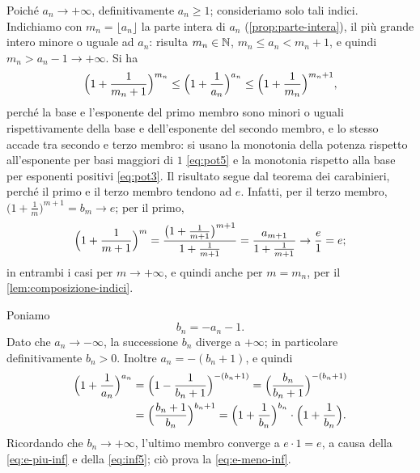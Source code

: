 \begin{dimostrazione}
Poiché $a_{n}\to+\infty$, definitivamente $a_{n}\ge1$; consideriamo solo tali indici.
Indichiamo con $m_{n}=\lfloor a_{n}\rfloor$ la parte intera di $a_{n}$
(\cref{prop:parte-intera}), il più grande intero minore o uguale ad $a_{n}$: risulta
$m_{n}\in\mathbb{N}$, $m_{n}\le a_{n}<m_{n}+1$, e quindi $m_{n}>a_{n}-1\to+\infty$. Si ha
\begin{equation}\label{eq:e-carabinieri}
  \Bigl(1+\frac1{m_{n}+1}\Bigr)^{m_{n}}\le\Bigl(1+\frac1{a_{n}}\Bigr)^{a_{n}}\le\Bigl(1+\frac1{m_{n}}\Bigr)^{m_{n}+1},
\end{equation}
perché la base e l'esponente del primo membro sono minori o uguali rispettivamente della
base e dell'esponente del secondo membro, e lo stesso accade tra secondo e terzo membro:
si usano la monotonia della potenza rispetto all'esponente per basi maggiori di $1$
\eqref{eq:pot5} e la monotonia rispetto alla base per esponenti positivi \eqref{eq:pot3}.
Il risultato segue dal teorema dei carabinieri, perché il primo e il terzo membro tendono
ad $e$. Infatti, per il terzo membro, $\bigl(1+\frac1{m}\bigr)^{m+1}=b_{m}\to e$; per il
primo,
\begin{equation}\label{eq:e-primo-membro}
  \Bigl(1+\frac1{m+1}\Bigr)^{m}=\frac{\bigl(1+\frac1{m+1}\bigr)^{m+1}}{1+\frac1{m+1}}
  =\frac{a_{m+1}}{1+\frac1{m+1}}\to\frac e1=e ;
\end{equation}
in entrambi i casi per $m\to+\infty$, e quindi anche per $m=m_{n}$, per il
\cref{lem:composizione-indici}.
\end{dimostrazione}

\begin{dimostrazione}
Poniamo
\begin{equation}\label{eq:e-cambio}
  b_{n}=-a_{n}-1 .
\end{equation}
Dato che $a_{n}\to-\infty$, la successione $b_{n}$ diverge a $+\infty$; in particolare
definitivamente $b_{n}>0$. Inoltre $a_{n}=-(b_{n}+1)$, e quindi
\begin{equation}\label{eq:e-meno-inf-passo}
\begin{split}
  \Bigl(1+\frac1{a_{n}}\Bigr)^{a_{n}}&=\Bigl(1-\frac1{b_{n}+1}\Bigr)^{-(b_{n}+1)}
  =\Bigl(\frac{b_{n}}{b_{n}+1}\Bigr)^{-(b_{n}+1)}\\
  &=\Bigl(\frac{b_{n}+1}{b_{n}}\Bigr)^{b_{n}+1}
  =\Bigl(1+\frac1{b_{n}}\Bigr)^{b_{n}}\cdot\Bigl(1+\frac1{b_{n}}\Bigr).
\end{split}
\end{equation}
Ricordando che $b_{n}\to+\infty$, l'ultimo membro converge a $e\cdot1=e$, a causa della
\eqref{eq:e-piu-inf} e della \eqref{eq:inf5}; ciò prova la \eqref{eq:e-meno-inf}.
\end{dimostrazione}

